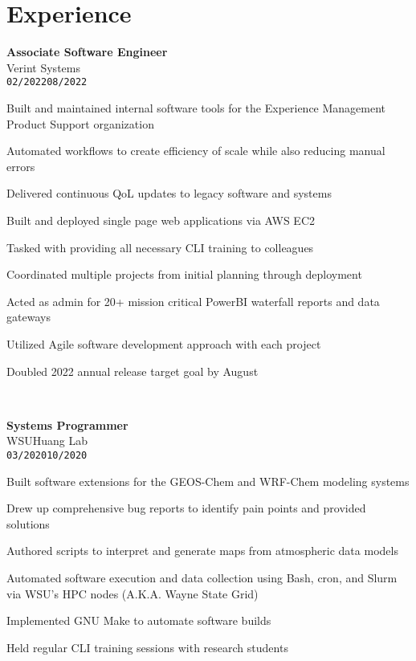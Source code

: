 \documentclass[11pt]{article}
\newenvironment{itemize*}%
  {\begin{itemize}[leftmargin=*,label=\faChevronRight]%
    \setlength{\itemsep}{0pt}%
    \setlength{\parskip}{0pt}%
    \setlength{\parsep}{0pt}}%
  {\end{itemize}}
\newcommand\workexp[5]{
    \hspace*{10pt}
    \begin{minipage}[t]{0.225\textwidth}
            \raggedleft
                \textbf{\fontsize{14}{10}\selectfont #1}\\ 
                #2\\
                \small\texttt{#3}\textendash \texttt{#4}
    \end{minipage}\hspace*{5pt}%
    \begin{minipage}[t]{0.7\textwidth}
        \raggedright
        \fontsize{10}{10}\selectfont#5
    \end{minipage}
}
\begin{document}
\section*{Experience}
\vspace*{-15pt}\workexp{Associate Software Engineer}{Verint Systems}{02/2022}{08/2022}{%
    \begin{itemize*}
        \item Built and maintained internal software tools for the Experience Management Product Support organization
        \item Automated workflows to create efficiency of scale while also reducing manual errors
        \item Delivered continuous QoL updates to legacy software and systems
        \item Built and deployed single page web applications via AWS EC2
        \item Tasked with providing all necessary CLI training to colleagues
        \item Coordinated multiple projects from initial planning through deployment
        \item Acted as admin for 20+ mission critical PowerBI waterfall reports and data gateways
        \item Utilized Agile software development approach with each project
        \item Doubled 2022 annual release target goal by August
    \end{itemize*}%
}
\vspace*{10pt}\\
\workexp{Systems Programmer}{WSU\textendash Huang Lab}{03/2020}{10/2020}{%
    \begin{itemize*}
        \item Built software extensions for the GEOS-Chem and WRF-Chem modeling systems
        \item Drew up comprehensive bug reports to identify pain points and provided solutions
        \item Authored scripts to interpret and generate maps from atmospheric data models
        \item Automated software execution and data collection using Bash, cron, and Slurm via WSU's HPC nodes (A.K.A. Wayne State Grid)
        \item Implemented GNU Make to automate software builds
        \item Held regular CLI training sessions with research students
    \end{itemize*}%
}
\end{document}
